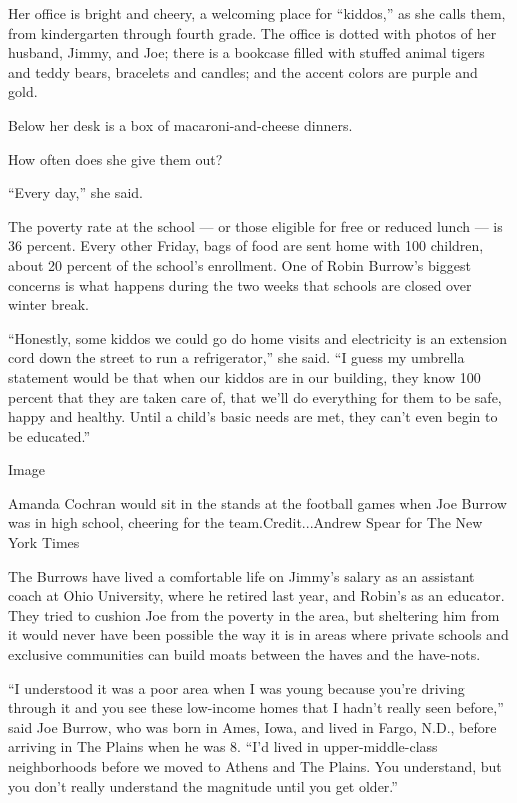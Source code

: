 Her office is bright and cheery, a welcoming place for ``kiddos,'' as
she calls them, from kindergarten through fourth grade. The office is
dotted with photos of her husband, Jimmy, and Joe; there is a bookcase
filled with stuffed animal tigers and teddy bears, bracelets and
candles; and the accent colors are purple and gold.

Below her desk is a box of macaroni-and-cheese dinners.

How often does she give them out?

``Every day,'' she said.

The poverty rate at the school --- or those eligible for free or reduced
lunch --- is 36 percent. Every other Friday, bags of food are sent home
with 100 children, about 20 percent of the school's enrollment. One of
Robin Burrow's biggest concerns is what happens during the two weeks
that schools are closed over winter break.

``Honestly, some kiddos we could go do home visits and electricity is an
extension cord down the street to run a refrigerator,'' she said. ``I
guess my umbrella statement would be that when our kiddos are in our
building, they know 100 percent that they are taken care of, that we'll
do everything for them to be safe, happy and healthy. Until a child's
basic needs are met, they can't even begin to be educated.''

Image

Amanda Cochran would sit in the stands at the football games when Joe
Burrow was in high school, cheering for the team.Credit...Andrew Spear
for The New York Times

The Burrows have lived a comfortable life on Jimmy's salary as an
assistant coach at Ohio University, where he retired last year, and
Robin's as an educator. They tried to cushion Joe from the poverty in
the area, but sheltering him from it would never have been possible the
way it is in areas where private schools and exclusive communities can
build moats between the haves and the have-nots.

``I understood it was a poor area when I was young because you're
driving through it and you see these low-income homes that I hadn't
really seen before,'' said Joe Burrow, who was born in Ames, Iowa, and
lived in Fargo, N.D., before arriving in The Plains when he was 8. ``I'd
lived in upper-middle-class neighborhoods before we moved to Athens and
The Plains. You understand, but you don't really understand the
magnitude until you get older.''

